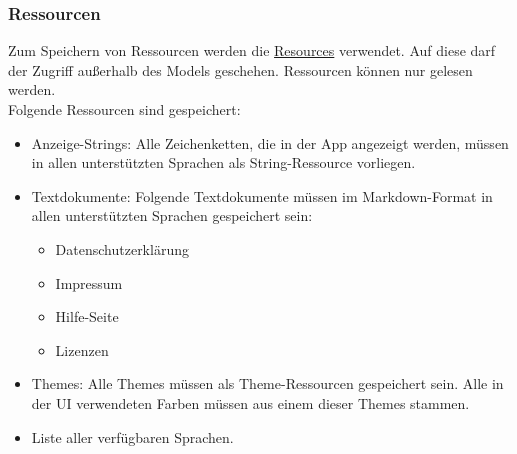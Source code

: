 \subsubsection{Ressourcen}\label{App_DataManagement_Ressourcen}
Zum Speichern von Ressourcen werden die \href{https://developer.android.com/reference/android/content/res/Resources}
{Resources} verwendet. Auf diese darf der Zugriff außerhalb des Models geschehen. Ressourcen können nur gelesen werden.\\
Folgende Ressourcen sind gespeichert:
\begin{itemize}
    \item Anzeige-Strings: Alle Zeichenketten, die in der App angezeigt werden, 
    müssen in allen unterstützten Sprachen als String-Ressource vorliegen.
    \item Textdokumente: Folgende Textdokumente müssen im Markdown-Format in allen unterstützten 
    Sprachen gespeichert sein:
    \begin{itemize}
        \item Datenschutzerklärung
        \item Impressum
        \item Hilfe-Seite
        \item Lizenzen
    \end{itemize}
    \item Themes: Alle Themes müssen als Theme-Ressourcen gespeichert sein. 
    Alle in der UI verwendeten Farben müssen aus einem dieser Themes stammen.
    \item Liste aller verfügbaren Sprachen.
\end{itemize}